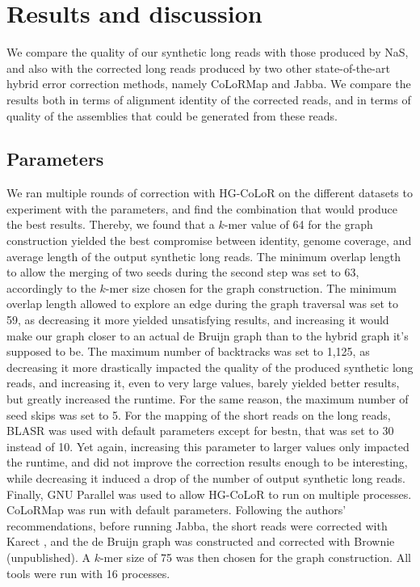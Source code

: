 \documentclass[long, final]{jobim2017}
\begin{document}
\section{Results and discussion}
\label{sec:results}

We compare the quality of our synthetic long reads with those produced by NaS, and also with the corrected long reads produced by two other state-of-the-art hybrid error correction methods, namely CoLoRMap and Jabba. We compare the results both in terms of alignment identity of the corrected reads, and in terms of quality of the assemblies that could be generated from these reads.

\subsection{Parameters}

We ran multiple rounds of correction with HG-CoLoR on the different datasets to experiment with the parameters, and find the combination that would produce the best results. Thereby, we found that a $k$-mer value of 64 for the graph construction yielded the best compromise between identity, genome coverage, and average length of the output synthetic long reads. The minimum overlap length to allow the merging of two seeds during the second step was set to 63, accordingly to the $k$-mer size chosen for the graph construction. The minimum overlap length allowed to explore an edge during the graph traversal was set to 59, as decreasing it more yielded unsatisfying results, and increasing it would make our graph closer to an actual de Bruijn graph than to the hybrid graph it's supposed to be. The maximum number of backtracks was set to 1,125, as decreasing it more drastically impacted the quality of the produced synthetic long reads, and increasing it, even to very large values, barely yielded better results, but greatly increased the runtime. For the same reason, the maximum number of seed skips was set to 5. For the mapping of the short reads on the long reads, BLASR was used with default parameters except for bestn, that was set to 30 instead of 10. Yet again, increasing this parameter to larger values only impacted the runtime, and did not improve the correction results enough to be interesting, while decreasing it induced a drop of the number of output synthetic long reads. Finally, GNU Parallel \cite{Tange2011} was used to allow HG-CoLoR to run on multiple processes. CoLoRMap was run with default parameters. Following the authors' recommendations, before running Jabba, the short reads were corrected with Karect \cite{Allam2015}, and the de Bruijn graph was constructed and corrected with Brownie (unpublished). A $k$-mer size of 75 was then chosen for the graph construction. All tools were run with 16 processes.
\end{document}
